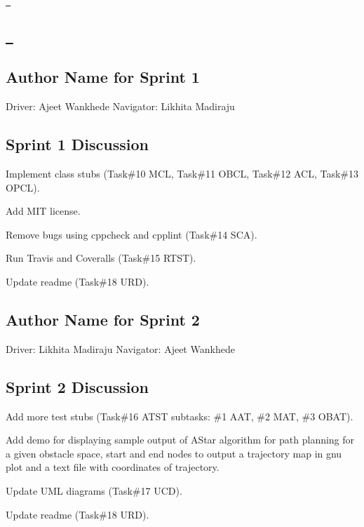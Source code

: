\href{https://travis-ci.org/ajeetwankhede/Midterm}\texttt{ } \subsection*{\href{https://coveralls.io/github/ajeetwankhede/Midterm?branch=master}\texttt{ } }

\subsection*{Author Name for Sprint 1}

Driver\+: Ajeet Wankhede Navigator\+: Likhita Madiraju

\subsection*{Sprint 1 Discussion}


\begin{DoxyEnumerate}
\item Implement class stubs (Task\#10 M\+CL, Task\#11 O\+B\+CL, Task\#12 A\+CL, Task\#13 O\+P\+CL).
\item Add M\+IT license.
\item Remove bugs using cppcheck and cpplint (Task\#14 S\+CA).
\item Run Travis and Coveralls (Task\#15 R\+T\+ST).
\item Update readme (Task\#18 U\+RD).
\end{DoxyEnumerate}

\subsection*{Author Name for Sprint 2}

Driver\+: Likhita Madiraju Navigator\+: Ajeet Wankhede

\subsection*{Sprint 2 Discussion}


\begin{DoxyEnumerate}
\item Add more test stubs (Task\#16 A\+T\+ST subtasks\+: \#1 A\+AT, \#2 M\+AT, \#3 O\+B\+AT).
\item Add demo for displaying sample output of A\+Star algorithm for path planning for a given obstacle space, start and end nodes to output a trajectory map in gnu plot and a text file with coordinates of trajectory.
\item Update U\+ML diagrams (Task\#17 U\+CD).
\item Update readme (Task\#18 U\+RD).
\end{DoxyEnumerate}

